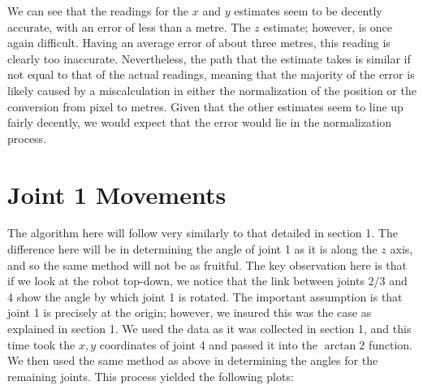 \documentclass[11pt]{article}
\begin{document}
We can see that the readings for the $x$ and $y$ estimates seem to be decently accurate, with an error of less than a metre.
The $z$ estimate; however, is once again difficult. 
Having an average error of about three metres, this reading is clearly too inaccurate. 
Nevertheless, the path that the estimate takes is similar if not equal to that of the actual readings, meaning that the majority of the error is likely caused by a miscalculation in either the normalization of the position or the conversion from pixel to metres. 
Given that the other estimates seem to line up fairly decently, we would expect that the error would lie in the normalization process. 

\section{Joint 1 Movements}

The algorithm here will follow very similarly to that detailed in section 1. 
The difference here will be in determining the angle of joint 1 as it is along the $z$ axis, and so the same method will not be as fruitful.
The key observation here is that if we look at the robot top-down, we notice that the link between joints 2/3 and 4 show the angle by which joint 1 is rotated. 
The important assumption is that joint 1 is precisely at the origin; however, we insured this was the case as explained in section 1. 
We used the data as it was collected in section 1, and this time took the $x,y$ coordinates of joint 4 and passed it into the $\arctan2$ function.
We then used the same method as above in determining the angles for the remaining joints. 
This process yielded the following plots:
\end{document}
